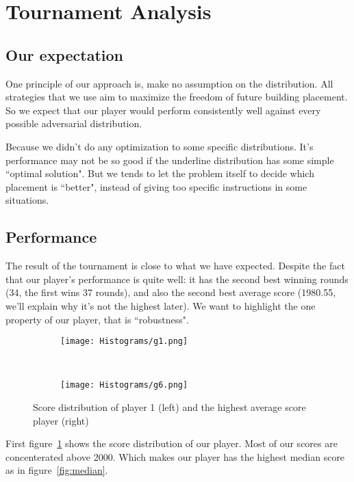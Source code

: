 \section{Tournament Analysis}

\subsection{Our expectation}
One principle of our approach is, make no assumption on the distribution.
All strategies that we use aim to maximize the freedom of future building placement.
So we expect that our player would perform consistently well against every possible adversarial distribution.

Because we didn't do any optimization to some specific distributions. It's performance may not be so good if
the underline distribution has some simple ``optimal solution". But we tends to let the problem itself to decide
which placement is ``better", instead of giving too specific instructions in some situations.

\subsection{Performance}

The result of the tournament is close to what we have expected.
Despite the fact that our player's performance is quite well: it has the second best winning rounds (34, the
first wins 37 rounds), and also the second best average score (1980.55, we'll explain why it's not the highest later).
We want to highlight the one property of our player, that is ``robustness".

\begin{figure}[ht]
\centering
\begin{subfigure}[t]{.45\textwidth}
\centering
\texttt{[image: Histograms/g1.png]}
\end{subfigure}
~
\begin{subfigure}[t]{.45\textwidth}
\centering
\texttt{[image: Histograms/g6.png]}
\end{subfigure}
\caption{Score distribution of player 1 (left) and the highest average score player (right)}\label{fig:scores}
\end{figure}

First figure~\ref{fig:scores} shows the score distribution of our player. Most of our scores are concenterated above
2000. Which makes our player has the highest median score as in figure~\ref{fig:median}. 

